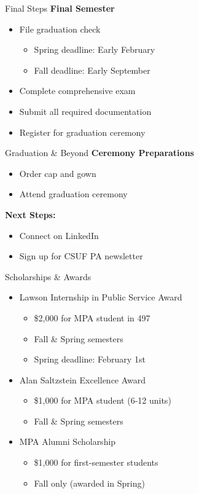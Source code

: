 \documentclass[10pt]{beamer}
\begin{document}
    \begin{frame}{Final Steps}
    \textbf{Final Semester}
    \begin{itemize}
    \item File graduation check
        \begin{itemize}
        \item Spring deadline: Early February
        \item Fall deadline: Early September
        \end{itemize}
    \item Complete comprehensive exam
    \item Submit all required documentation
    \item Register for graduation ceremony
    \end{itemize}
    \end{frame}
    
    \begin{frame}{Graduation \& Beyond}
    \textbf{Ceremony Preparations}
    \begin{itemize}
    \item Order cap and gown
    \item Attend graduation ceremony
    \end{itemize}
    
    \textbf{Next Steps:}
    \begin{itemize}
    \item Connect on LinkedIn
    \item Sign up for CSUF PA newsletter
    \end{itemize}
    \end{frame}

\begin{frame}{Scholarships \& Awards}
\begin{itemize}
\item Lawson Internship in Public Service Award
    \begin{itemize}
    \item \$2,000 for MPA student in 497
    \item Fall \& Spring semesters
    \item Spring deadline: February 1st
    \end{itemize}
\item Alan Saltzstein Excellence Award
    \begin{itemize}
    \item \$1,000 for MPA student (6-12 units)
    \item Fall \& Spring semesters
    \end{itemize}
\item MPA Alumni Scholarship
    \begin{itemize}
    \item \$1,000 for first-semester students
    \item Fall only (awarded in Spring)
    \end{itemize}
\end{itemize}
\end{frame}
\end{document}
